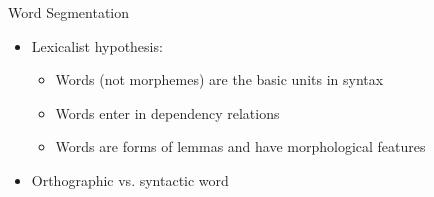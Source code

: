 \documentclass[10pt, compress, aspectratio=169]{beamer}
\begin{document}
\begin{frame}{Word Segmentation}
\begin{itemize}
\item Lexicalist hypothesis:
  \begin{itemize}
  \item Words (not morphemes) are the basic units in syntax
  \item Words enter in dependency relations
  \item Words are forms of lemmas and have morphological features
  \end{itemize}
\bigskip
\item Orthographic vs. syntactic word
  \begin{itemize}

\end{itemize}
\end{itemize}
\end{frame}
\end{document}
